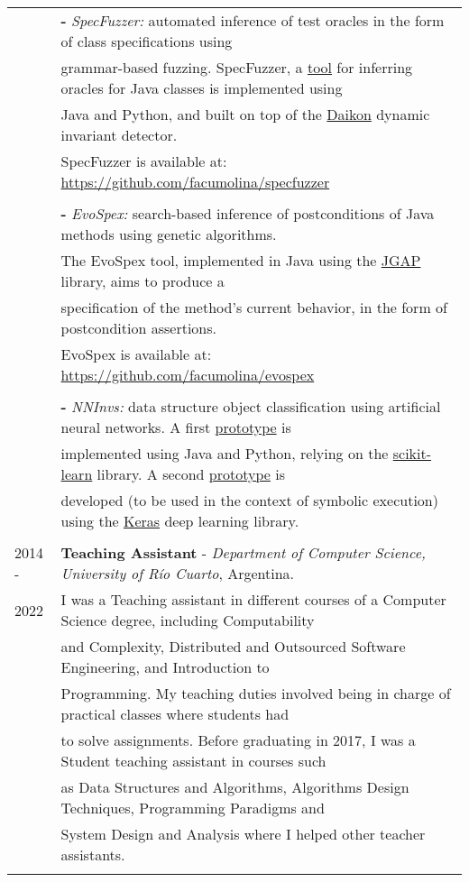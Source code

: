 \documentclass[a4paper,10pt]{article} %
\begin{document}
\begin{longtable}{ll}
& \textbf{-} \textit{SpecFuzzer:} automated inference of test oracles in the form of class specifications using \\
& grammar-based fuzzing. SpecFuzzer, a \href{https://github.com/facumolina/specfuzzer}{tool} 
for inferring oracles for Java classes is implemented using \\ 
& Java and Python, and built on top of the \href{https://plse.cs.washington.edu/daikon/}{Daikon} dynamic invariant detector. \\ 
& SpecFuzzer is available at: \href{https://github.com/facumolina/specfuzzer}{https://github.com/facumolina/specfuzzer} \\ & \\ 

& \textbf{-} \textit{EvoSpex:} search-based inference of postconditions of Java methods using genetic algorithms. \\
& The EvoSpex tool, implemented in Java using the \href{https://homepages.ecs.vuw.ac.nz/~lensenandr/jgap/documentation/}{JGAP} library, aims to produce a \\
& specification of the method's current behavior, in the form of postcondition assertions. \\
& EvoSpex is available at: \href{https://github.com/facumolina/evospex}{https://github.com/facumolina/evospex} \\ & \\

& \textbf{-} \textit{NNInvs:} data structure object classification using artificial neural networks. A first \href{https://sites.google.com/site/learninginvariants}{prototype} is \\
& implemented using Java and Python, relying on the \href{https://scikit-learn.org/stable/index.html}{scikit-learn} library. A second \href{https://sites.google.com/site/learninginvariants}{prototype} is \\ 
& developed (to be used in the context of symbolic execution) using the \href{https://keras.io/}{Keras} deep learning library. \\ & \\

2014 - & \textbf{Teaching Assistant} - \textit{Department of Computer Science, University of Río Cuarto}, Argentina. \\ 
2022 & I was a Teaching assistant in different courses of a Computer Science degree, including Computability \\
& and Complexity, Distributed and Outsourced Software Engineering, and Introduction to \\
& Programming. My teaching duties involved being in charge of practical classes where students had \\  
& to solve assignments. Before graduating in 2017, I was a Student teaching assistant in courses such \\ 
& as Data Structures and Algorithms, Algorithms Design Techniques, Programming Paradigms and \\
& System Design and Analysis where I helped other teacher assistants. \\ & \\


\end{longtable}
\end{document}
